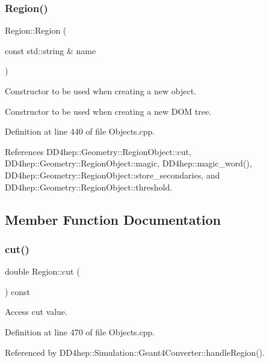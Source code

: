 \subsubsection{\texorpdfstring{Region()}{Region()}\hspace{0.1cm}{\footnotesize\ttfamily [5/5]}}
{\footnotesize\ttfamily Region\+::\+Region (\begin{DoxyParamCaption}\item[{const std\+::string \&}]{name }\end{DoxyParamCaption})}



Constructor to be used when creating a new object. 

Constructor to be used when creating a new D\+OM tree. 

Definition at line 440 of file Objects.\+cpp.



References D\+D4hep\+::\+Geometry\+::\+Region\+Object\+::cut, D\+D4hep\+::\+Geometry\+::\+Region\+Object\+::magic, D\+D4hep\+::magic\+\_\+word(), D\+D4hep\+::\+Geometry\+::\+Region\+Object\+::store\+\_\+secondaries, and D\+D4hep\+::\+Geometry\+::\+Region\+Object\+::threshold.



\subsection{Member Function Documentation}
\hypertarget{class_d_d4hep_1_1_geometry_1_1_region_a2bb062861e634298019cec364dc03342}{}\label{class_d_d4hep_1_1_geometry_1_1_region_a2bb062861e634298019cec364dc03342} 
\subsubsection{\texorpdfstring{cut()}{cut()}}
{\footnotesize\ttfamily double Region\+::cut (\begin{DoxyParamCaption}{ }\end{DoxyParamCaption}) const}



Access cut value. 



Definition at line 470 of file Objects.\+cpp.



Referenced by D\+D4hep\+::\+Simulation\+::\+Geant4\+Converter\+::handle\+Region().

